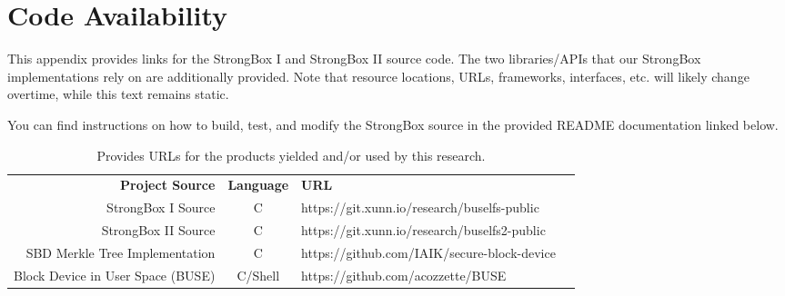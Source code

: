 \renewcommand\thechapter{A}
\chapter{Code Availability} \label{app:availability}

This appendix provides links for the StrongBox I and StrongBox II source code.
The two libraries/APIs that our StrongBox implementations rely on are
additionally provided. Note that resource locations, URLs, frameworks,
interfaces, etc. will likely change overtime, while this text remains static.

You can find instructions on how to build, test, and modify the StrongBox source
in the provided README documentation linked below.

\begin{table}
    \centering
    \caption{Provides URLs for the products yielded and/or used by this research.}
    \begin{tabular}{|r|c|l|l}
        \cline{1-3}
        \textbf{Project Source} & \textbf{Language} & \textbf{URL} & \\
        \cline{1-3}
        StrongBox I Source & C & https://git.xunn.io/research/buselfs-public & \\
        StrongBox II Source & C & https://git.xunn.io/research/buselfs2-public & \\
        SBD Merkle Tree Implementation & C & https://github.com/IAIK/secure-block-device & \\
        Block Device in User Space (BUSE) & C/Shell & https://github.com/acozzette/BUSE & \\
        \cline{1-3}
    \end{tabular}
\end{table}

